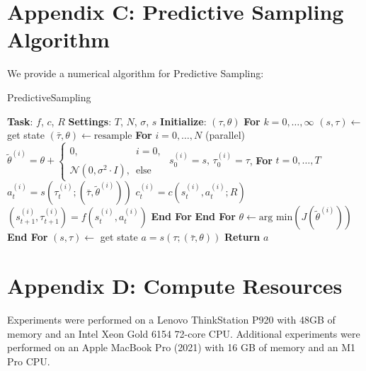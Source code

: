 \section{Appendix C: Predictive Sampling Algorithm}
We provide a numerical algorithm for Predictive Sampling:

\begin{algorithm}[H]
	\caption{PredictiveSampling}\label{ps_predictive_sampling_algorithm_numeric}
	\begin{algorithmic}[1]
		\State \textbf{Task}: $f$, $c$, $R$
		\State \textbf{Settings}: $T$, $N$, $\sigma$, $s$
		\State \textbf{Initialize}: $(\tau, \theta)$
		\State \textbf{For} $k = 0, \dots, \infty$
		\State \indent $(s, \tau) \leftarrow$ get state
		\State \indent $(\bar{\tau}, \theta) \leftarrow \text{resample}$
		\State \indent \textbf{For} $i = 0, \dots, N$ (parallel)
		\State \indent \indent $\tilde{\theta}^{(i)} = \theta + 
		\begin{cases}
			0, \phantom{\mathcal{N}(0, \sigma^2 \cdot I)} i = 0, \\ 
			\mathcal{N}(0, \sigma^2 \cdot I), \phantom{0} \text{else} 
		\end{cases}$
		\State \indent \indent $s^{(i)}_0 = s, \, \tau_0^{(i)} = \tau$,
		\State \indent \indent \textbf{For} $t = 0, \dots, T$
		\State \indent \indent \indent $a^{(i)}_{t} = s(\tau^{(i)}_t; (\bar{\tau}, \tilde{\theta}^{(i)}))$
		\State \indent \indent \indent $c^{(i)}_{t} = c(s^{(i)}_t, a^{(i)}_t; R)$
		\State \indent \indent \indent $(s^{(i)}_{t+1}, \tau^{(i)}_{t+1}) = f(s^{(i)}_t, a^{(i)}_t)$
		\State \indent \indent \textbf{End For}
		\State \indent \textbf{End For} 
		\State \indent $\theta \leftarrow \text{arg min}\left(J(\tilde{\theta}^{(i)})\right)$
		\State \textbf{End For}
		\EndProcedure
		\State $(s, \tau) \leftarrow$ get state
		\State $a = s(\tau; (\bar{\tau}, \theta))$
		\State \textbf{Return} $a$
		\EndProcedure
	\end{algorithmic}
\end{algorithm}

\section{Appendix D: Compute Resources}
Experiments were performed on a Lenovo ThinkStation P920 with 48GB of memory and an Intel Xeon Gold 6154 72-core CPU. Additional experiments were performed on an Apple MacBook Pro (2021) with 16 GB of memory and an M1 Pro CPU.

